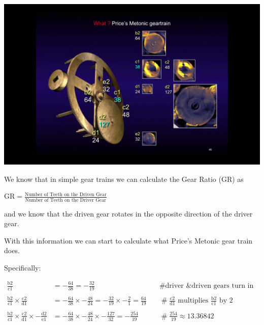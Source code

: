 \documentclass[11pt, oneside]{article}   	%
\theoremstyle{definition}
\begin{document}
\begin{minipage}[c]{0.5\textwidth}
  \includegraphics[width=\textwidth,cfbox=red]{images/price_metonic_gear_train.png}
\end{minipage}

\noindent
We know that in simple gear trains we can calculate the Gear Ratio (GR) as 

\bigskip
\begin{center}
{\Large $\text{GR} = \frac{\text{Number of Teeth on the Driven Gear}}{\text{Number of Teeth on the Driver Gear}}$}
\end{center}

\bigskip
\noindent
and we know that the driven gear rotates in the opposite direction of the driver gear. 


\bigskip
\noindent
With this information we can start to calculate what Price's Metonic gear train does. 

\bigskip
\noindent
Specifically:

\begin{equation*}
\begin{array}{lllll}
\frac{\text{b2}}{\text{c1}} &= - \frac{64}{38} = - \frac{32}{19} & \quad \mathrel{\#} \text{driver \& driven gears turn in opposite directions} \\ \\
\frac{\text{b2}}{\text{c1}} \times \frac{\text{c2}}{\text{d1}} &= - \frac{64}{38} \times - \frac{48}{24} = - \frac{32}{19} \times - \frac{2}{1} = \frac{64}{19} 
& \quad \mathrel{\#} \frac{\text{c2}}{\text{d1}} \text{ multiplies $\frac{\text{b2}}{\text{c1}}$ by $2$}                       \\ \\
\frac{\text{b2}}{\text{c1}} \times \frac{\text{c2}}{\text{d1}} \times - \frac{\text{d2}}{\text{e1}} &= - \frac{64}{38} \times - \frac{48}{24} \times - \frac{127}{32} 
=  -\frac{254}{19} & \quad \mathrel{\#} \frac{254}{19} \approx 13.36842
\end{array}
\end{equation*}
\end{document}
